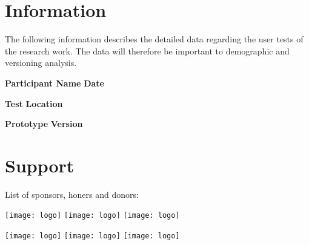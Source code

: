 
\section*{Information}

The following information describes the detailed data regarding the user tests of the research work. The data will therefore be important to demographic and versioning analysis.

\vspace{1cm}

\textbf{Participant Name} \hfill \textbf{Date}

\vspace{2.5cm}

\textbf{Test} \hfill \textbf{Location}

\vspace{2.5cm}

\textbf{Prototype} \hfill \textbf{Version}

\vfill


\section*{Support}

\hfill

List of sponsors, honers and donors:

\hfill


\hfill

\texttt{[image: logo]} \hfill \texttt{[image: logo]} \hfill \texttt{[image: logo]}

\texttt{[image: logo]} \hfill \texttt{[image: logo]} \hfill \texttt{[image: logo]}

\hfill


